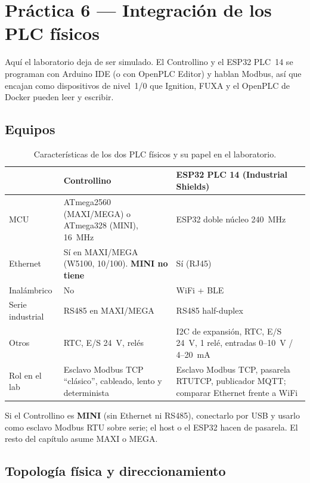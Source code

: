 \chapter{Práctica 6 --- Integración de los PLC físicos}
\label{cap:hardware}

Aquí el laboratorio deja de ser simulado. El Controllino y el ESP32 PLC~14 se programan con Arduino IDE (o con OpenPLC Editor) y hablan Modbus, así que encajan como dispositivos de nivel~1/0 que Ignition, FUXA y el OpenPLC de Docker pueden leer y escribir.

\section{Equipos}

\begin{table}[H]
\centering\small
\caption{Características de los dos PLC físicos y su papel en el laboratorio.}
\label{tab:plcs}
\begin{tabularx}{\textwidth}{L{2.4cm} X X}
\toprule
 & \textbf{Controllino} & \textbf{ESP32 PLC 14 (Industrial Shields)} \\
\midrule
MCU & ATmega2560 (MAXI/MEGA) o ATmega328 (MINI), 16~MHz & ESP32 doble núcleo 240~MHz \\
Ethernet & Sí en MAXI/MEGA (W5100, 10/100). \textbf{MINI no tiene} & Sí (RJ45) \\
Inalámbrico & No & WiFi + BLE \\
Serie industrial & RS485 en MAXI/MEGA & RS485 half-duplex \\
Otros & RTC, E/S 24~V, relés & I2C de expansión, RTC, E/S 24~V, 1 relé, entradas 0--10~V / 4--20~mA \\
Rol en el lab & Esclavo Modbus TCP ``clásico'', cableado, lento y determinista & Esclavo Modbus TCP, pasarela RTU\ra{}TCP, publicador MQTT; comparar Ethernet frente a WiFi \\
\bottomrule
\end{tabularx}
\end{table}

\begin{nota}
Si el Controllino es \textbf{MINI} (sin Ethernet ni RS485), conectarlo por USB y usarlo como esclavo Modbus RTU sobre serie; el host o el ESP32 hacen de pasarela. El resto del capítulo asume MAXI o MEGA.
\end{nota}

\section{Topología física y direccionamiento}

